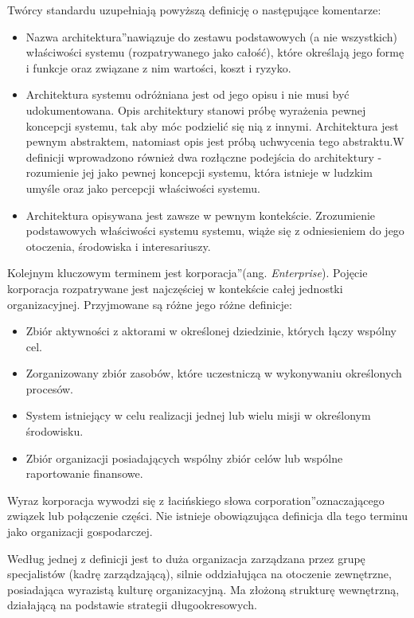 Twórcy standardu uzupełniają powyższą definicję o następujące komentarze: 
\begin{itemize}
\item{Nazwa \quotedblbase architektura\textquotedblright nawiązuje do zestawu podstawowych (a nie wszystkich) właściwości systemu (rozpatrywanego jako całość), które określają jego formę i funkcje oraz związane z nim wartości, koszt i ryzyko.}
\item{Architektura systemu odróżniana jest od jego opisu i nie musi być udokumentowana. Opis architektury stanowi próbę wyrażenia pewnej koncepcji systemu, tak aby móc podzielić się nią z innymi. Architektura jest pewnym abstraktem, natomiast opis jest próbą uchwycenia tego abstraktu.W definicji wprowadzono również dwa rozłączne podejścia do architektury - rozumienie jej jako pewnej koncepcji systemu, która istnieje w ludzkim  umyśle oraz jako percepcji właściwości systemu.}
\item{Architektura opisywana jest zawsze w pewnym kontekście. Zrozumienie podstawowych właściwości systemu systemu, wiąże się z odniesieniem do jego otoczenia, środowiska i interesariuszy.}
\end{itemize}

Kolejnym kluczowym terminem jest \quotedblbase korporacja\textquotedblright (ang. \textit{Enterprise}). Pojęcie korporacja rozpatrywane jest najczęściej w kontekście całej jednostki organizacyjnej. Przyjmowane są różne jego różne definicje:
\begin{itemize}
\item{Zbiór aktywności z aktorami w określonej dziedzinie, których łączy wspólny cel.}
\item{Zorganizowany zbiór zasobów, które uczestniczą w wykonywaniu określonych procesów.}
\item{System istniejący w celu realizacji jednej lub wielu misji w określonym środowisku.}
\item{Zbiór organizacji posiadających wspólny zbiór celów lub wspólne raportowanie finansowe.}
\end{itemize}

Wyraz korporacja wywodzi się z łacińskiego słowa \quotedblbase corporation\textquotedblright oznaczającego związek lub połączenie części. Nie istnieje obowiązująca definicja dla tego terminu jako organizacji gospodarczej. 

Według jednej z definicji jest to duża organizacja zarządzana przez grupę specjalistów (kadrę zarządzającą), silnie oddziałująca na otoczenie zewnętrzne, posiadająca wyrazistą kulturę organizacyjną. Ma złożoną strukturę wewnętrzną, działającą na podstawie strategii długookresowych.


